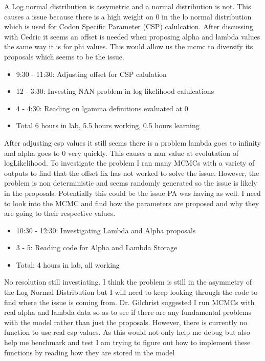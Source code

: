 \documentclass[12pt,hyperref]{labbook}
\begin{document}
A Log normal distribution is assymetric and a normal distribution is not. This causes a issue because there is a high weight on 0 in the lo normal distribution which is used for Codon Specific Parameter (CSP) calulcation. After discussing with Cedric it seems an offset is needed when proposing alpha and lambda values the same way it is for phi values. This would allow us the mcmc to diversify its proposals which seems to be the issue.
\begin{itemize}
    \item 9:30 - 11:30: Adjusting offset for CSP calulation
    \item 12 - 3:30: Investing NAN problem in log likelihood calulcations
    \item 4 - 4:30: Reading on lgamma definitions evaluated at 0
    \item Total 6 hours in lab, 5.5 hours working, 0.5 hours learning
\end{itemize}
After adjusting csp values it still seems there is a problem lambda goes to infinity and alpha goes to 0 very quickly. This causes a nan value at evolutation of logLikelihood.
To investigate the problem I ran many MCMCs with a variety of outputs to find that the offset fix has not worked to solve the issue. However, the problem is non deterministic and seems randomly generated so the issue is likely in the proposals.
Potentially this could be the issue PA was having as well. I need to look into the MCMC and find how the parameters are proposed and why they are going to their respective values.
\begin{itemize}
    \item 10:30 - 12:30: Investigating Lambda and Alpha proposals
    \item 3 - 5: Reading code for Alpha and Lambda Storage
    \item Total: 4 hours in lab, all working
\end{itemize}
No resolution still investiating. I think the problem is still in the asymmetry of the Log Normal Distribution but I will need to keep looking through the code to find where the issue is coming from.
Dr. Gilchrist suggested I run MCMCs with real alpha and lambda data so as to see if there are any fundamental problems with the model rather than just the proposals. However, there is currently no function to use real csp values. As this would not only help me debug but also help me benchmark and test I am trying to figure out how to implement these functions by reading how they are stored in the model
\end{document}
